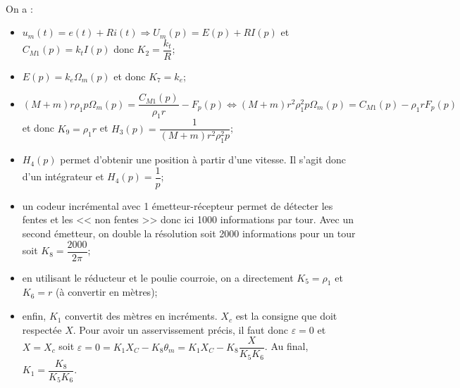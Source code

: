 \begin{multicols}{2}
\ifprof
\begin{corrige}~\\
On a :
\begin{itemize}
\item $ u_m(t)=e(t)+Ri(t) \Rightarrow  U_m(p)=E(p)+RI(p) $ et $C_{M1}(p)=k_t I(p)$ donc $K_2 = \dfrac{k_t}{R}$;
\item $E(p)=k_e\Omega_m(p)$ et donc $K_7 = k_e$;
\item $\left(M+m\right)r\rho_1 p\Omega_m(p)=\dfrac{C_{M1}(p)}{\rho_1 r}-F_p(p) \Leftrightarrow\left(M+m\right)r^2\rho_1^2 p\Omega_m(p)=C_{M1}(p)-\rho_1 rF_p(p) $ et donc $K_9 = \rho_1 r$ et $H_3(p)=\dfrac{1}{\left(M+m\right)r^2\rho_1^2 p}$;
\item  $H_4(p)$ permet d'obtenir une position à partir d'une vitesse. Il s'agit donc d'un intégrateur et $H_4(p)=\dfrac{1}{p}$; 
\item un codeur incrémental avec 1 émetteur-récepteur permet de détecter les fentes et les << non fentes >> donc ici 1000 informations par tour. Avec un second émetteur, on double la résolution soit 2000 informations pour un tour soit $K_8  = \dfrac{2000}{2\pi}$;
\item en utilisant le réducteur et le poulie courroie, on a directement $K_5=\rho_1$ et $K_6=r$ (à convertir en mètres);
\item enfin, $K_1$ convertit des mètres en incréments. $X_c$ est la consigne que doit respectée $X$. Pour avoir un asservissement précis, il faut donc $\varepsilon = 0$ et $X=X_c$ soit $\varepsilon = 0 = K_1 X_C - K_8 \theta_m = K_1 X_C - K_8 \dfrac{X}{K_5 K_6}$. Au final, $K_1 =\dfrac{K_8}{K_5 K_6}$.
\end{itemize}
\end{corrige}
\else
\fi


\end{multicols}
